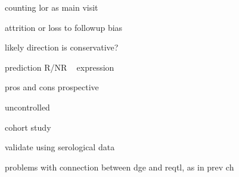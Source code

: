 \begin{outline}
counting lor as main visit

attrition or loss to followup bias



    likely direction is conservative?

prediction
    R/NR ~ expression

pros and cons
    prospective

    uncontrolled

    cohort study

validate using serological data

problems with connection between dge and reqtl, as in prev ch

\end{outline}
